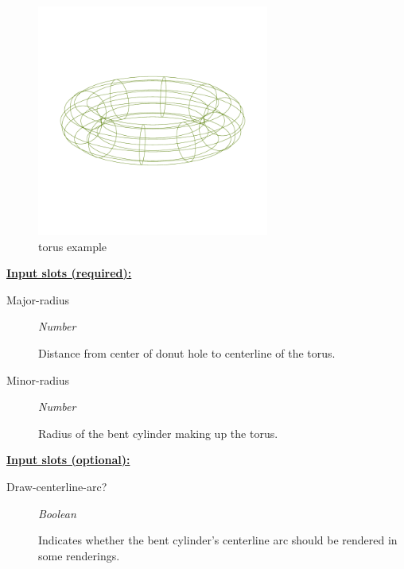\documentclass [11pt]{book}
\begin{document}
\begin{itemize}
\begin{figure}
\begin{center}
\includegraphics[width=3in,height=3in]{../images/example-torus.pdf}
\end{center}

\caption{torus example}

\label{fig:torus}

\end{figure}





\textbf{
\underline{Input slots (required):}}

\begin{description}

\item [Major-radius]
\emph{Number}

 Distance from center of donut hole to centerline of the torus.




\item [Minor-radius]
\emph{Number}

 Radius of the bent cylinder making up the torus.




\end{description}






\textbf{
\underline{Input slots (optional):}}

\begin{description}

\item [Draw-centerline-arc?]
\emph{Boolean}

 Indicates whether the bent cylinder's centerline arc should be rendered in some renderings.





\end{description}
\end{itemize}
\end{document}
